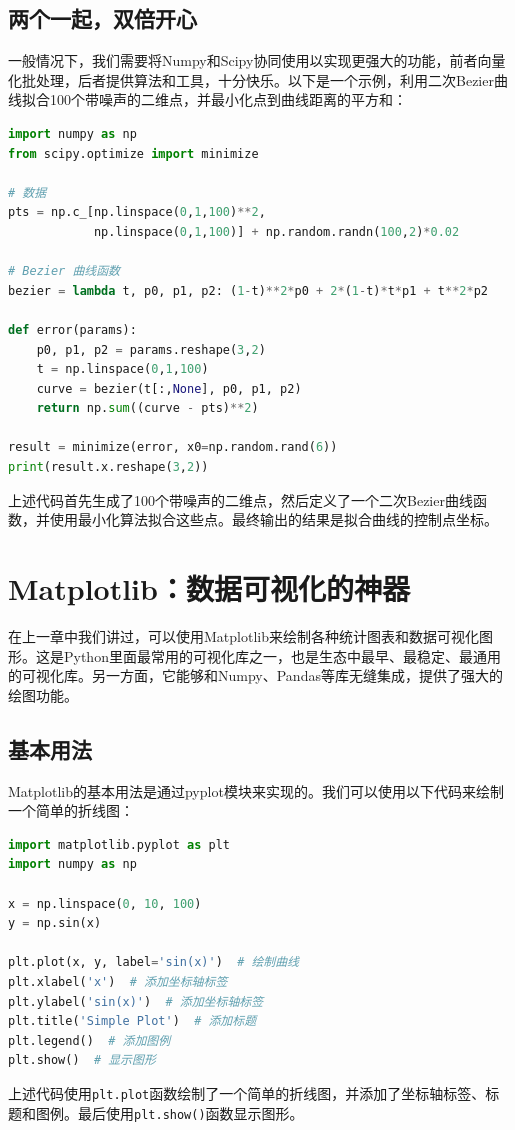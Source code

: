\documentclass[../main.tex]{subfiles}
\begin{document}
\subsection{两个一起，双倍开心}

一般情况下，我们需要将Numpy和Scipy协同使用以实现更强大的功能，前者向量化批处理，后者提供算法和工具，十分快乐。以下是一个示例，利用二次Bezier曲线拟合100个带噪声的二维点，并最小化点到曲线距离的平方和：
\begin{lstlisting}[language=python]
import numpy as np
from scipy.optimize import minimize

# 数据
pts = np.c_[np.linspace(0,1,100)**2,
            np.linspace(0,1,100)] + np.random.randn(100,2)*0.02

# Bezier 曲线函数
bezier = lambda t, p0, p1, p2: (1-t)**2*p0 + 2*(1-t)*t*p1 + t**2*p2

def error(params):
    p0, p1, p2 = params.reshape(3,2)
    t = np.linspace(0,1,100)
    curve = bezier(t[:,None], p0, p1, p2)
    return np.sum((curve - pts)**2)

result = minimize(error, x0=np.random.rand(6))
print(result.x.reshape(3,2))
\end{lstlisting}
上述代码首先生成了100个带噪声的二维点，然后定义了一个二次Bezier曲线函数，并使用最小化算法拟合这些点。最终输出的结果是拟合曲线的控制点坐标。

\section{Matplotlib：数据可视化的神器}

在上一章中我们讲过，可以使用Matplotlib来绘制各种统计图表和数据可视化图形。这是Python里面最常用的可视化库之一，也是生态中最早、最稳定、最通用的可视化库。另一方面，它能够和Numpy、Pandas等库无缝集成，提供了强大的绘图功能。

\subsection{基本用法}

Matplotlib的基本用法是通过pyplot模块来实现的。我们可以使用以下代码来绘制一个简单的折线图：
\begin{lstlisting}[language=python]
import matplotlib.pyplot as plt
import numpy as np

x = np.linspace(0, 10, 100)
y = np.sin(x)

plt.plot(x, y, label='sin(x)')  # 绘制曲线
plt.xlabel('x')  # 添加坐标轴标签
plt.ylabel('sin(x)')  # 添加坐标轴标签
plt.title('Simple Plot')  # 添加标题
plt.legend()  # 添加图例
plt.show()  # 显示图形
\end{lstlisting}
上述代码使用\texttt{plt.plot}函数绘制了一个简单的折线图，并添加了坐标轴标签、标题和图例。最后使用\texttt{plt.show()}函数显示图形。
\end{document}
